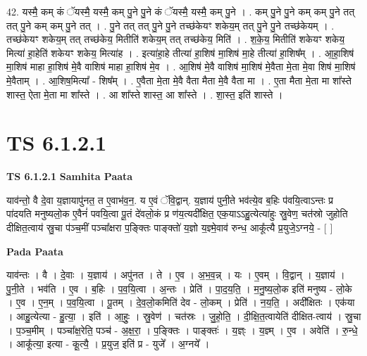 \documentclass[17pt]{extarticle}
\begin{document}
42. यस्मै॒ कम् कं ॅयस्मै॒ यस्मै॒ कम् पु॒ने पु॒ने कं ॅयस्मै॒ यस्मै॒ कम् पु॒ने । . कम् पु॒ने पु॒ने कम् कम् पु॒ने तत् तत् पु॒ने कम् कम् पु॒ने तत् । . पु॒ने तत् तत् पु॒ने पु॒ने तच्छ॑केयꣳ शकेय॒म् तत् पु॒ने पु॒ने तच्छ॑केयम् । . तच्छ॑केयꣳ शकेय॒म् तत् तच्छ॑केय॒ मितीति॑ शकेय॒म् तत् तच्छ॑केय॒ मिति॑ । . श॒के॒य॒ मितीति॑ शकेयꣳ शकेय॒ मित्या॑ हा॒हेति॑ शकेयꣳ शकेय॒ मित्या॑ह । . इत्या॑हा॒हे तीत्या॑ हा॒शिष॑ मा॒शिष॑ मा॒हे तीत्या॑ हा॒शिष᳚म् । . आ॒हा॒शिष॑ मा॒शिष॑ माहा हा॒शिष॑ मे॒वै वाशिष॑ माहा हा॒शिष॑ मे॒व । . आ॒शिष॑ मे॒वै वाशिष॑ मा॒शिष॑ मे॒वैता मे॒ता मे॒वा शिष॑ मा॒शिष॑ मे॒वैताम् । . आ॒शिष॒मित्या᳚ - शिष᳚म् । . ए॒वैता मे॒ता मे॒वै वैता मैता मे॒वै वैता मा । . ए॒ता मैता मे॒ता मा शा᳚स्ते शास्त॒ ऐता मे॒ता मा शा᳚स्ते । . आ शा᳚स्ते शास्त॒ आ शा᳚स्ते । . शा॒स्त॒ इति॑ शास्ते । \newline
\pagebreak
{}

\section{ TS 6.1.2.1 }

\textbf{TS 6.1.2.1 } \newline
\textbf{Samhita Paata} \newline

याव॑न्तो॒ वै दे॒वा य॒ज्ञायापु॑नत॒ त ए॒वाभ॑व॒न॒. य ए॒वं ॅवि॒द्वान्. य॒ज्ञाय॑ पुनी॒ते भव॑त्ये॒व ब॒हिः प॑वयि॒त्वाऽन्तः प्र पा॑दयति मनुष्यलो॒क ए॒वैनं॑ पवयि॒त्वा पू॒तं दे॑वलो॒कं प्र ण॑य॒त्यदी᳚क्षित॒ एक॒याऽऽहु॒त्येत्या॑हुः स्रु॒वेण॒ चत॑स्रो जुहोति दीक्षित॒त्वाय॑ स्रु॒चा प॑ञ्च॒मीं पञ्चा᳚क्षरा प॒ङ्क्तिः पाङ्क्तो॑ य॒ज्ञो य॒ज्ञ्मे॒वाव॑ रुन्ध॒ आकू᳚त्यै प्र॒युजे॒ऽग्नये॒ - [  ] \newline

\textbf{Pada Paata} \newline

याव॑न्तः । वै । दे॒वाः । य॒ज्ञाय॑ । अपु॑नत । ते । ए॒व । अ॒भ॒व॒न्न् । यः । ए॒वम् । वि॒द्वान् । य॒ज्ञाय॑ । पु॒नी॒ते । भव॑ति । ए॒व । ब॒हिः । प॒व॒यि॒त्वा । अ॒न्तः । प्रेति॑ । पा॒द॒य॒ति॒ । म॒नु॒ष्य॒लो॒क इति॑ मनुष्य - लो॒के । ए॒व । ए॒न॒म् । प॒व॒यि॒त्वा । पू॒तम् । दे॒व॒लो॒कमिति॑ देव - लो॒कम् । प्रेति॑ । न॒य॒ति॒ । अदी᳚क्षितः । एक॑या । आहु॒त्येत्या - हु॒त्या॒ । इति॑ । आ॒हुः॒ । स्रु॒वेण॑ । चत॑स्रः । जु॒हो॒ति॒ । दी॒क्षि॒त॒त्वायेति॑ दीक्षित-त्वाय॑ । स्रु॒चा । प॒ञ्च॒मीम् । पञ्चा᳚क्ष॒रेति॒ पञ्च॑ - अ॒क्ष॒रा॒ । प॒ङ्क्तिः । पाङ्क्तः॑ । य॒ज्ञ्ः । य॒ज्ञ्म् । ए॒व । अवेति॑ । रु॒न्धे॒ । आकू᳚त्या॒ इत्या - कू॒त्यै॒ । प्र॒युज॒ इति॑ प्र - युजे᳚ । अ॒ग्नये᳚ ।  \newline
\end{document}
